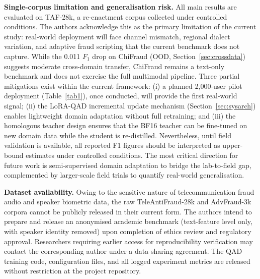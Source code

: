 \documentclass[final,5p,times,number]{elsarticle}
\begin{document}
\textbf{Single-corpus limitation and generalisation risk.} All main results are evaluated on TAF-28k, a re-enactment corpus collected under controlled conditions. The authors acknowledge this as the primary limitation of the current study: real-world deployment will face channel mismatch, regional dialect variation, and adaptive fraud scripting that the current benchmark does not capture. While the 0.011 $F_1$ drop on ChiFraud (OOD, Section~\ref{sec:crossdata}) suggests moderate cross-domain transfer, ChiFraud remains a text-only benchmark and does not exercise the full multimodal pipeline. Three partial mitigations exist within the current framework: (i) a planned 2{,}000-user pilot deployment (Table~\ref{tab1}), once conducted, will provide the first real-world signal; (ii) the LoRA-QAD incremental update mechanism (Section~\ref{sec:sysarch}) enables lightweight domain adaptation without full retraining; and (iii) the homologous teacher design ensures that the BF16 teacher can be fine-tuned on new domain data while the student is re-distilled. Nevertheless, until field validation is available, all reported F1 figures should be interpreted as upper-bound estimates under controlled conditions. The most critical direction for future work is semi-supervised domain adaptation to bridge the lab-to-field gap, complemented by larger-scale field trials to quantify real-world generalisation.

\medskip
\noindent\textbf{Dataset availability.} Owing to the sensitive nature of telecommunication fraud audio and speaker biometric data, the raw TeleAntiFraud-28k and AdvFraud-3k corpora cannot be publicly released in their current form. The authors intend to prepare and release an anonymised academic benchmark (text-feature level only, with speaker identity removed) upon completion of ethics review and regulatory approval. Researchers requiring earlier access for reproducibility verification may contact the corresponding author under a data-sharing agreement. The QAD training code, configuration files, and all logged experiment metrics are released without restriction at the project repository.
\end{document}
